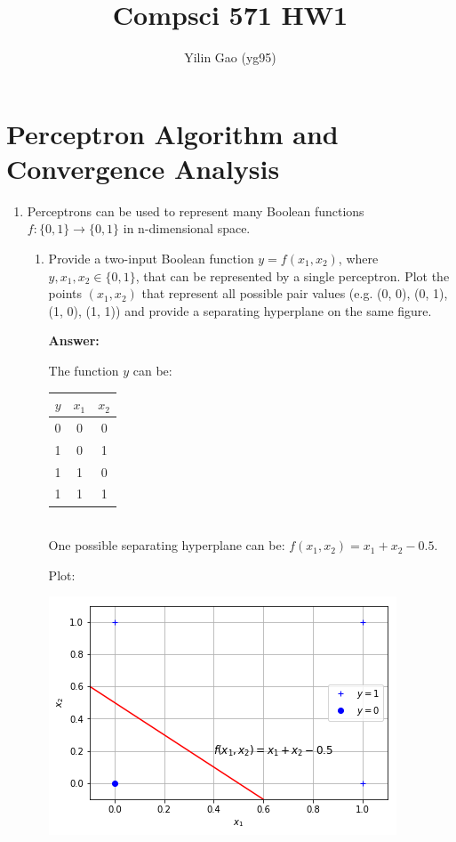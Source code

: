\documentclass[paper=letter, fontsize=12pt]{article}
\title{Compsci 571 HW1}
\author{Yilin Gao (yg95)}
\begin{document}
\maketitle

\section{Perceptron Algorithm and Convergence Analysis}

\begin{enumerate}
\item Perceptrons can be used to represent many Boolean functions $f: \{0, 1\} \rightarrow \{0, 1\}$ in n-dimensional space.
\begin{enumerate}
	\item Provide a two-input Boolean function $y = f(x_1, x_2)$, where $y, x_1, x_2 \in \{0, 1\}$, that can be represented by a single perceptron. Plot the points $(x_1, x_2)$ that represent all possible pair values (e.g. (0, 0), (0, 1), (1, 0), (1, 1)) and provide a separating hyperplane on the same figure.
	
	\textbf{Answer:}
	
	The function $y$ can be:
	
	\begin{tabular} {|c|c|c|}
		\hline
		$y$ & $x_1$ & $x_2$	\\ \hline
		0 & 0 & 0 \\ \hline
		1 & 0 & 1 \\ \hline
		1 & 1 & 0 \\ \hline
		1 & 1 & 1 \\ \hline
	\end{tabular} \\

	One possible separating hyperplane can be: $f(x_1, x_2) = x_1 + x_2 - 0.5$. 
	
	Plot: 
	
	\includegraphics[scale=0.5]{1a.png}
	

\end{enumerate}
\end{enumerate}
\end{document}
